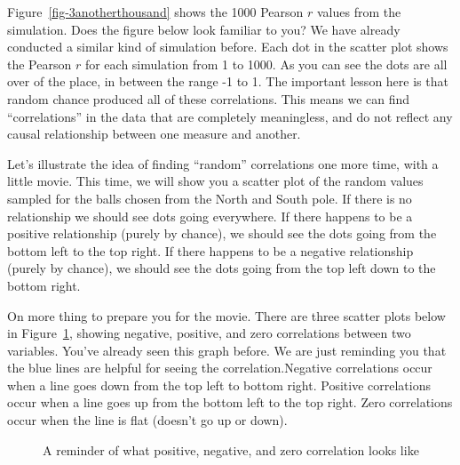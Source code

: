 \documentclass[
  letterpaper,
  DIV=11,
  numbers=noendperiod]{scrreprt}
\begin{document}
Figure~\ref{fig-3anotherthousand} shows the 1000 Pearson \(r\) values
from the simulation. Does the figure below look familiar to you? We have
already conducted a similar kind of simulation before. Each dot in the
scatter plot shows the Pearson \(r\) for each simulation from 1 to 1000.
As you can see the dots are all over of the place, in between the range
-1 to 1. The important lesson here is that random chance produced all of
these correlations. This means we can find ``correlations'' in the data
that are completely meaningless, and do not reflect any causal
relationship between one measure and another.

Let's illustrate the idea of finding ``random'' correlations one more
time, with a little movie. This time, we will show you a scatter plot of
the random values sampled for the balls chosen from the North and South
pole. If there is no relationship we should see dots going everywhere.
If there happens to be a positive relationship (purely by chance), we
should see the dots going from the bottom left to the top right. If
there happens to be a negative relationship (purely by chance), we
should see the dots going from the top left down to the bottom right.

On more thing to prepare you for the movie. There are three scatter
plots below in Figure~\ref{fig-3reminder}, showing negative, positive,
and zero correlations between two variables. You've already seen this
graph before. We are just reminding you that the blue lines are helpful
for seeing the correlation.Negative correlations occur when a line goes
down from the top left to bottom right. Positive correlations occur when
a line goes up from the bottom left to the top right. Zero correlations
occur when the line is flat (doesn't go up or down).

\begin{figure}


\caption{\label{fig-3reminder}A reminder of what positive, negative, and
zero correlation looks like}

\end{figure}%
\end{document}
